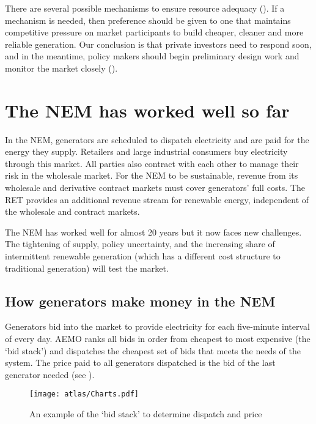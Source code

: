 \documentclass[FrontPage]{grattan}
\begin{document}
There are several possible mechanisms to ensure resource adequacy (). If a mechanism is needed, then preference should be given to one that maintains competitive pressure on market participants to build cheaper, cleaner and more reliable generation. Our conclusion is that private investors need to respond soon, and in the meantime, policy makers should begin preliminary design work and monitor the market closely ().



\chapter{The NEM has worked well so far}\label{chap:how-the-market-incentivises-new-investment}
In the NEM, generators are scheduled to dispatch electricity and are paid for the energy they supply. Retailers and large industrial consumers buy electricity through this market. All parties also contract with each other to manage their risk in the wholesale market. For the NEM to be sustainable, revenue from its wholesale and derivative contract markets must cover generators' full costs. The RET provides an additional revenue stream for renewable energy, independent of the wholesale and contract markets.

The NEM has worked well for almost 20 years but it now faces new challenges. The tightening of supply, policy uncertainty, and the increasing share of intermittent renewable generation (which has a different cost structure to traditional generation) will test the market.

\section{How generators make money in the NEM}\label{sec:how-generators-make-money-in-the-NEM}
Generators bid into the market to provide electricity for each five-minute interval of every day. AEMO ranks all bids in order from cheapest to most expensive (the `bid stack') and dispatches the cheapest set of bids that meets the needs of the system. The price paid to all generators dispatched is the bid of the last generator needed (see ).

\begin{figure}
\caption{An example of the `bid stack' to determine dispatch and price}\label{fig:scheduling-of-NEM-generators}
\texttt{[image: atlas/Charts.pdf]}
\end{figure}
\end{document}
